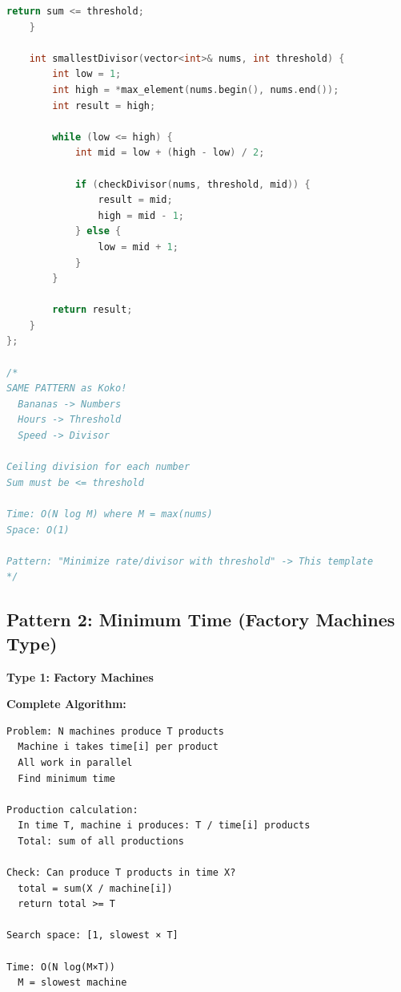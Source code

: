 \documentclass[11pt,a4paper,oneside]{book}
\begin{document}
\begin{lstlisting}[language=C++, caption=Complete Minimum Speed Solutions]
        return sum <= threshold;
    }
    
    int smallestDivisor(vector<int>& nums, int threshold) {
        int low = 1;
        int high = *max_element(nums.begin(), nums.end());
        int result = high;
        
        while (low <= high) {
            int mid = low + (high - low) / 2;
            
            if (checkDivisor(nums, threshold, mid)) {
                result = mid;
                high = mid - 1;
            } else {
                low = mid + 1;
            }
        }
        
        return result;
    }
};

/*
SAME PATTERN as Koko!
  Bananas -> Numbers
  Hours -> Threshold
  Speed -> Divisor

Ceiling division for each number
Sum must be <= threshold

Time: O(N log M) where M = max(nums)
Space: O(1)

Pattern: "Minimize rate/divisor with threshold" -> This template
*/
\end{lstlisting}

\subsection{Pattern 2: Minimum Time (Factory Machines Type)}

\begin{tcolorbox}[
    enhanced,breakable,
    colback=lightgray,
    colframe=accentorange,
    boxrule=2pt,
    arc=4mm,
    title=\textbf{Complete Minimum Time Algorithms}
]
\textbf{Type 1: Factory Machines}

\textbf{Complete Algorithm:}
\begin{verbatim}
Problem: N machines produce T products
  Machine i takes time[i] per product
  All work in parallel
  Find minimum time

Production calculation:
  In time T, machine i produces: T / time[i] products
  Total: sum of all productions

Check: Can produce T products in time X?
  total = sum(X / machine[i])
  return total >= T

Search space: [1, slowest × T]

Time: O(N log(M×T))
  M = slowest machine
\end{verbatim}
\end{tcolorbox}
\end{document}
